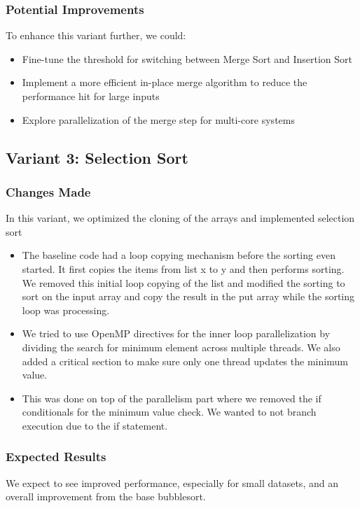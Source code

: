 \documentclass[twocolumn]{article}
\begin{document}
\subsubsection{Potential Improvements}
To enhance this variant further, we could:
\begin{itemize}
    \item Fine-tune the threshold for switching between Merge Sort and Insertion Sort
    \item Implement a more efficient in-place merge algorithm to reduce the performance hit for large inputs
    \item Explore parallelization of the merge step for multi-core systems
\end{itemize}
\subsection{Variant 3: Selection Sort }

\subsubsection{Changes Made}
In this variant, we optimized the cloning of the arrays and implemented selection sort
\begin{itemize}
    \item The baseline code had a loop copying mechanism before the sorting even started. It first copies the items from list x to y and then performs sorting. We removed this initial loop copying of the list and modified the sorting to sort on the input array and copy the result in the put array while the sorting loop was processing. 
    \item We tried to use OpenMP directives for the inner loop parallelization by dividing the search for minimum element across multiple threads. We also added a critical section to make sure only one thread updates the minimum value.
    \item  This was done on top of the parallelism part where we removed the if conditionals for the minimum value check. We wanted to not branch execution due to the if statement.
\end{itemize}

\subsubsection{Expected Results}
We expect to see improved performance, especially for small datasets, and an overall improvement from the base bubblesort.
\end{document}
